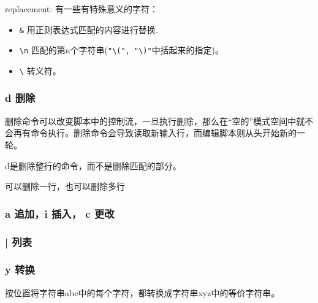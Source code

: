 replacement:
有一些有特殊意义的字符：
\begin{itemize}
\item \lstinline$&$ 用正则表达式匹配的内容进行替换.
\item \lstinline$\n$ 匹配的第n个字符串(\lstinline$"\(", "\)"$中括起来的指定)。
\item \lstinline$\$ 转义符。
\end{itemize}


\subsubsection{d 删除}

删除命令可以改变脚本中的控制流，一旦执行删除，那么在“空的”模式空间中就不会再有命令执行。删除命令会导致读取新输入行，而编辑脚本则从头开始新的一轮。

d是删除整行的命令，而不是删除匹配的部分。

可以删除一行，也可以删除多行

\subsubsection{a 追加，i 插入， c 更改}



\subsubsection{| 列表}

\subsubsection{y 转换}

按位置将字符串abc中的每个字符，都转换成字符串xyz中的等价字符串。




